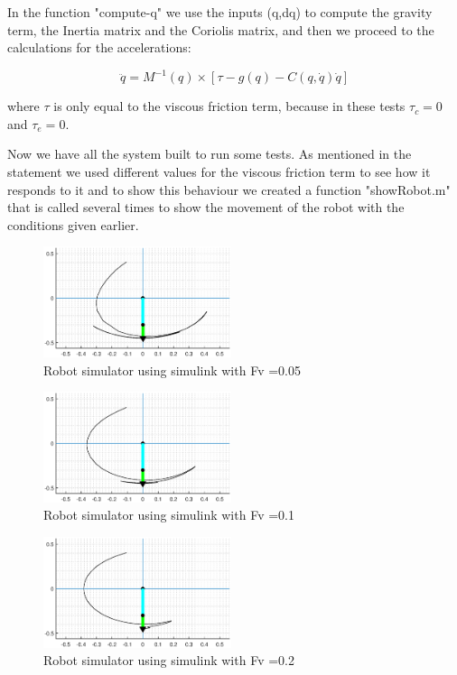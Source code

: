 In the function "compute-q" we use the inputs (q,dq) to compute the gravity term, the Inertia matrix and the Coriolis matrix, and then we proceed to the calculations for the accelerations:

\begin{equation}
    \ddot{q} = M^{-1}(q) \times [\tau - g(q) - C(q,\dot{q})\dot{q}]
\end{equation}

where $\tau$ is only equal to the viscous friction term, because in these tests $\tau_c = 0$ and $\tau_e = 0$.

Now we have all the system built to run some tests. As mentioned in the statement we used different values for the  viscous friction term to see how it responds to it and to show this behaviour we created a function "showRobot.m" that is called several times to show the movement of the robot with the conditions given earlier.

\begin{figure}[H]
    \centering
    \includegraphics[width=0.49\textwidth]{imgs/4.1.eps}
    \caption{Robot simulator using simulink with Fv =0.05}
    \label{fig:4.2}
\end{figure}

\begin{figure}[H]
    \centering
    \includegraphics[width=0.49\textwidth]{imgs/4.2.eps}
    \caption{Robot simulator using simulink with Fv =0.1}
    \label{fig:4.3}
\end{figure}

\begin{figure}[H]
    \centering
    \includegraphics[width=0.49\textwidth]{imgs/4.3.eps}
    \caption{Robot simulator using simulink with Fv =0.2}
    \label{fig:4.4}
\end{figure}

